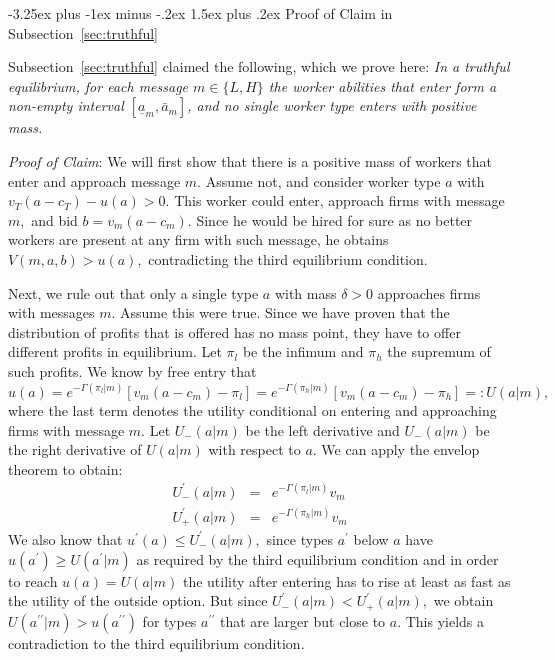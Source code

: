 \documentclass[12pt]{article}
\makeatletter
\renewcommand{\subsection}{%
  \@startsection{subsection}{2}{\z@}%
  {-3.25ex plus -1ex minus -.2ex}%
  {1.5ex plus .2ex}%
  {\normalfont\large\bfseries}%
}
\makeatother
\begin{document}
\subsection{Proof of Claim in Subsection~\ref{sec:truthful}}\label{online_app:proof_claim}

Subsection~\ref{sec:truthful} claimed the following, which we prove here: \textit{In a truthful equilibrium, for each message $m\in\{L,H\}$ the worker abilities that enter form a non-empty interval $[\underline{a}_{m},\bar{a}_{m}]$, and no single worker type enters with positive mass.}

\bigskip

\textit{Proof of Claim}: We will first show that there is a positive mass of workers that
enter and approach message $m.$ Assume not, and consider worker type $a$
with $v_{T}(a-c_{T})-u\left( a\right) >0.$ This worker could enter, approach
firms with message $m,$ and bid $b=v_{m}(a-c_{m}).$ Since he would be hired
for sure as no better workers are present at any firm with such message, he
obtains $V(m,a,b)>u(a),$ contradicting the third equilibrium condition.

Next, we rule out that only a single type $a$ with mass $\delta >0$
approaches firms with messages $m$. Assume this were true. Since we have
proven that the distribution of profits that is offered has no mass point,
they have to offer different profits in equilibrium. Let $\pi _{l}$ be the
infimum and $\pi _{h}$ the supremum of such profits. We know by free entry
that $u(a)=e^{-\Gamma (\pi _{l}|m)}\left[ v_{m}(a-c_{m})-\pi _{l}\right]
=e^{-\Gamma (\pi _{h}|m)}\left[ v_{m}(a-c_{m})-\pi _{h}\right] =:U(a|m),$
where the last term denotes the utility conditional on entering and
approaching firms with message $m.$ Let $U_{-}(a|m)$ be the left derivative
and $U_{-}(a|m)$ be the right derivative of $U(a|m)$ with respect to $a.$ We
can apply the envelop theorem to obtain:%
\begin{eqnarray*}
U_{-}^{\prime }(a|m) &=&e^{-\Gamma (\pi _{l}|m)}v_{m} \\
U_{+}^{\prime }(a|m) &=&e^{-\Gamma (\pi _{h}|m)}v_{m}
\end{eqnarray*}%
We also know that $u^{\prime }(a)\leq U_{-}^{\prime }(a|m),$ since types $%
a^{\prime }$ below $a$ have $u(a^{\prime })\geq U(a^{\prime }|m)$ as
required by the third equilibrium condition and in order to reach $%
u(a)=U(a|m)$ the utility after entering has to rise at least as fast as the
utility of the outside option. But since $U_{-}^{\prime }(a|m)<U_{+}^{\prime
}(a|m),$ we obtain $U(a^{\prime \prime }|m)>u(a^{\prime \prime })$ for types 
$a^{\prime \prime }$ that are larger but close to $a.$ This yields a
contradiction to the third equilibrium condition.
\end{document}
